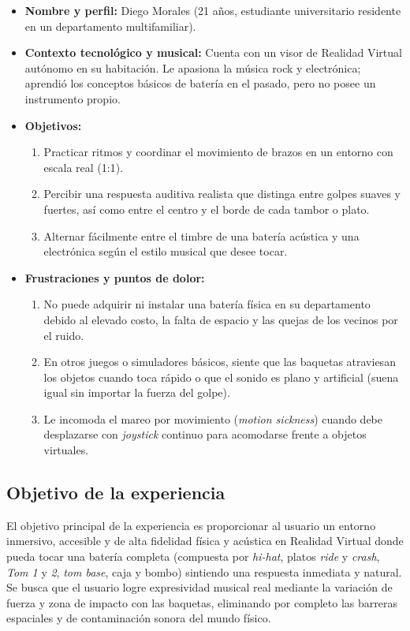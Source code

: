 \documentclass{article}
\begin{document}
\begin{itemize}
    \item \textbf{Nombre y perfil:} Diego Morales (21 años, estudiante universitario residente en un departamento multifamiliar).
    \item \textbf{Contexto tecnológico y musical:} Cuenta con un visor de Realidad Virtual autónomo en su habitación. Le apasiona la música rock y electrónica; aprendió los conceptos básicos de batería en el pasado, pero no posee un instrumento propio.
    \item \textbf{Objetivos:}
    \begin{enumerate}
        \item Practicar ritmos y coordinar el movimiento de brazos en un entorno con escala real (1:1).
        \item Percibir una respuesta auditiva realista que distinga entre golpes suaves y fuertes, así como entre el centro y el borde de cada tambor o plato.
        \item Alternar fácilmente entre el timbre de una batería acústica y una electrónica según el estilo musical que desee tocar.
    \end{enumerate}
    \item \textbf{Frustraciones y puntos de dolor:}
    \begin{enumerate}
        \item No puede adquirir ni instalar una batería física en su departamento debido al elevado costo, la falta de espacio y las quejas de los vecinos por el ruido.
        \item En otros juegos o simuladores básicos, siente que las baquetas atraviesan los objetos cuando toca rápido o que el sonido es plano y artificial (suena igual sin importar la fuerza del golpe).
        \item Le incomoda el mareo por movimiento (\textit{motion sickness}) cuando debe desplazarse con \textit{joystick} continuo para acomodarse frente a objetos virtuales.
    \end{enumerate}
\end{itemize}

\subsection{Objetivo de la experiencia}
El objetivo principal de la experiencia es proporcionar al usuario un entorno inmersivo, accesible y de alta fidelidad física y acústica en Realidad Virtual donde pueda tocar una batería completa (compuesta por \textit{hi-hat}, platos \textit{ride} y \textit{crash}, \textit{Tom 1} y \textit{2}, \textit{tom base}, caja y bombo) sintiendo una respuesta inmediata y natural. Se busca que el usuario logre expresividad musical real mediante la variación de fuerza y zona de impacto con las baquetas, eliminando por completo las barreras espaciales y de contaminación sonora del mundo físico.
\end{document}
